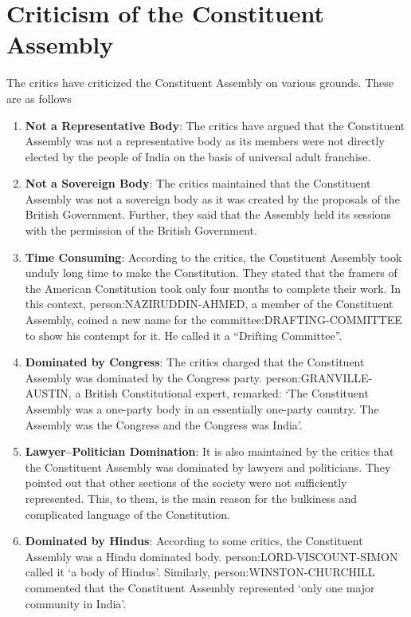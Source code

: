 \section{Criticism of the Constituent Assembly}

The critics have criticized the Constituent Assembly on various grounds. These are as follows

\begin{enumerate}
  \item \textbf{Not a Representative Body}: The critics have argued that the Constituent  Assembly was not a representative body as its members were not directly elected by the people of India on the basis of universal adult franchise.
  \item \textbf{Not a Sovereign Body}: The critics maintained that the Constituent Assembly was not a sovereign body as it was created by the proposals of the British Government. Further, they said that the Assembly held its sessions with the permission of the British Government.
  \item \textbf{Time Consuming}: According to the critics, the Constituent Assembly took unduly long time to make the Constitution. They stated that the framers of the American Constitution took only four months to complete their work. In this context, \gls{person:NAZIRUDDIN-AHMED}, a member of the Constituent Assembly, coined a new name for the \gls{committee:DRAFTING-COMMITTEE} to show his contempt for it. He called it a ``Drifting Committee''.
  \item \textbf{Dominated by Congress}: The critics charged that the Constituent Assembly was dominated by the Congress party. \gls{person:GRANVILLE-AUSTIN}, a British Constitutional expert, remarked: `The Constituent Assembly was a one-party body in an essentially one-party country. The Assembly was the Congress and the Congress was India'.
  \item \textbf{Lawyer–Politician Domination}: It is also maintained by the critics that the Constituent Assembly was dominated by lawyers and politicians. They pointed out that other sections of the society were not sufficiently represented. This, to them, is the main reason for the bulkiness and complicated language of the Constitution.
  \item \textbf{Dominated by Hindus}: According to some critics, the Constituent Assembly was a Hindu dominated body. \gls{person:LORD-VISCOUNT-SIMON} called it `a body of Hindus'. Similarly, \gls{person:WINSTON-CHURCHILL} commented that the Constituent Assembly represented `only one major community in India'.
\end{enumerate}


